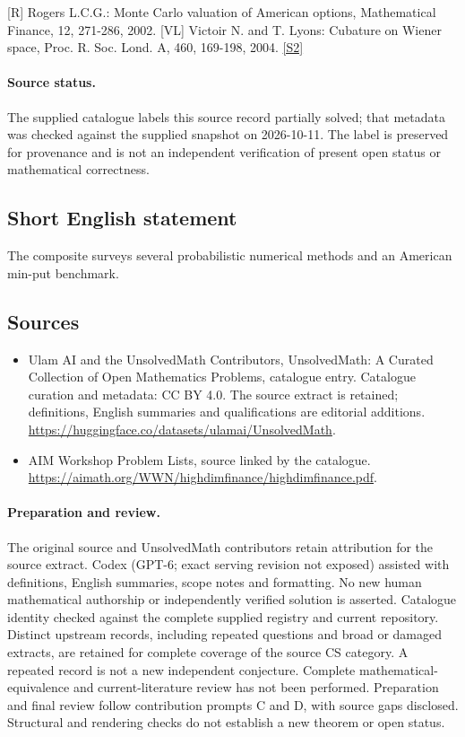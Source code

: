 \documentclass[11pt]{article}
\begin{document}
[R] Rogers L.C.G.: Monte Carlo valuation of American options, Mathematical Finance, 12, 271-286, 2002. [VL] Victoir N. and T. Lyons: Cubature on Wiener space, Proc. R. Soc. Lond. A, 460, 169-198, 2004. \href{https://aimath.org/WWN/highdimfinance/highdimfinance.pdf}{[S2]}
\paragraph{Source status.}
The supplied catalogue labels this source record partially solved; that metadata was checked against the supplied snapshot on 2026-10-11. The label is preserved for provenance and is not an independent verification of present open status or mathematical correctness.
\subsection{Short English statement}
The composite surveys several probabilistic numerical methods and an American min-put benchmark.
\subsection{Sources}
\begin{itemize}
\item[S1] Ulam AI and the UnsolvedMath Contributors, UnsolvedMath: A Curated Collection of Open Mathematics Problems, catalogue entry. Catalogue curation and metadata: CC BY 4.0. The source extract is retained; definitions, English summaries and qualifications are editorial additions.
\url{https://huggingface.co/datasets/ulamai/UnsolvedMath}.
\item[S2] AIM Workshop Problem Lists, source linked by the catalogue.
\url{https://aimath.org/WWN/highdimfinance/highdimfinance.pdf}.
\end{itemize}
\paragraph{Preparation and review.}
The original source and UnsolvedMath contributors retain attribution for the source extract. Codex (GPT-6; exact serving revision not exposed) assisted with definitions, English summaries, scope notes and formatting. No new human mathematical authorship or independently verified solution is asserted. Catalogue identity checked against the complete supplied registry and current repository. Distinct upstream records, including repeated questions and broad or damaged extracts, are retained for complete coverage of the source CS category. A repeated record is not a new independent conjecture. Complete mathematical-equivalence and current-literature review has not been performed. Preparation and final review follow contribution prompts C and D, with source gaps disclosed. Structural and rendering checks do not establish a new theorem or open status.
\label{end:statement}
\end{document}
